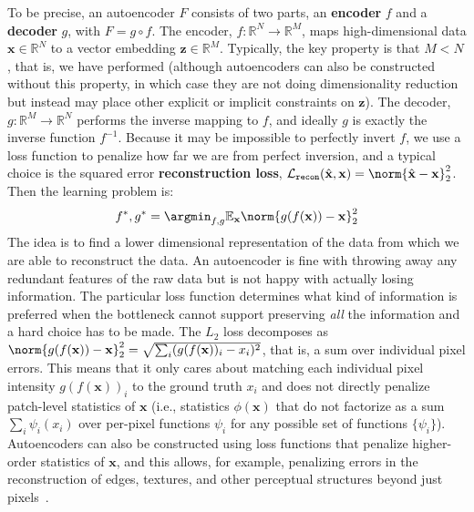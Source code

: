 To be precise, an autoencoder $F$ consists of two parts, an \textbf{encoder} $f$ and a \textbf{decoder} $g$, with $F = g \circ f$. The encoder, $f: \mathbb{R}^N \rightarrow \mathbb{R}^M$, maps high-dimensional data $\mathbf{x} \in \mathbb{R}^N$ to a vector embedding $\mathbf{z} \in \mathbb{R}^M$. Typically, the key property is that $M < N$, that is, we have performed  (although autoencoders can also be constructed without this property, in which case they are not doing dimensionality reduction but instead may place other explicit or implicit constraints on $\mathbf{z}$). The decoder, $g: \mathbb{R}^M \rightarrow \mathbb{R}^N$ performs the inverse mapping to $f$, and ideally $g$ is exactly the inverse function $f^{-1}$. Because it may be impossible to perfectly invert $f$, we use a loss function to penalize how far we are from perfect inversion, and a typical choice is the squared error \textbf{reconstruction loss}, $\mathcal{L}_{\texttt{recon}}(\hat{\mathbf{x}}, \mathbf{x}) = \norm{\hat{\mathbf{x}} - \mathbf{x}}_2^2$. Then the learning problem is:
\begin{equation}
    f^*,g^* = \argmin_{f,g} \mathbb{E}_{\mathbf{x}} \norm{g(f(\mathbf{x})) - \mathbf{x}}_2^2 \label{eqn:representation_learning:autoencoder_learning_problem}
\end{equation}
The idea is to find a lower dimensional representation of the data from which we are able to reconstruct the data. An autoencoder is fine with throwing away any redundant features of the raw data but is not happy with actually losing information. The particular loss function determines what kind of information is preferred when the bottleneck cannot support preserving \textit{all} the information and a hard choice has to be made. The $L_2$ loss decomposes as $\norm{g(f(\mathbf{x})) - \mathbf{x}}_2^2 = \sqrt{\sum_i (g(f(\mathbf{x}))_i - x_i)^2}$, that is, a sum over individual pixel errors. This means that it only cares about matching each individual pixel intensity $g(f(\mathbf{x}))_i$ to the ground truth $x_i$ and does not directly penalize patch-level statistics of $\mathbf{x}$ (i.e., statistics $\phi(\mathbf{x})$ that do not factorize as a sum $\sum_i \psi_i(x_i)$ over per-pixel functions $\psi_i$ for any possible set of functions $\{\psi_i\}$). Autoencoders can also be constructed using loss functions that penalize higher-order statistics of $\mathbf{x}$, and this allows, for example, penalizing errors in the reconstruction of edges, textures, and other perceptual structures beyond just pixels~\cite{snell2017learning}.%

